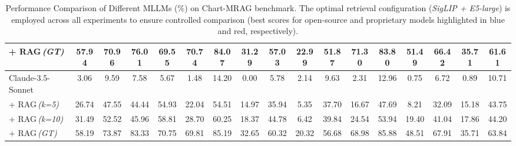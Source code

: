 \begin{table*}[t]
{\begin{tabular}{l|cc|c|c|cc|cc|cc|cc|cc|cc}
\hspace{2em}  + RAG\,\textit{(GT)} & 57.94 & 70.96 & 76.01 & 69.55 & \colorbox{lightblue!75}{70.74} & 84.07 & 31.29 & 57.03 & 22.99 & 51.87 & \colorbox{lightblue!75}{71.30} & 83.80 & \colorbox{lightblue!75}{51.49} & 66.42 & 35.71 & 61.61 \\

\midrule
Claude-3.5-Sonnet & \colorbox{lightblue!75}{3.06} & \colorbox{lightblue!75}{9.59} & 7.58 & 5.67 & 1.48 & 14.20 & \colorbox{lightblue!75}{0.00} & 5.78 & \colorbox{lightblue!75}{2.14} & \colorbox{lightblue!75}{9.63} & \colorbox{lightblue!75}{2.31} & 12.96 & 0.75 & \colorbox{lightblue!75}{6.72} & \colorbox{lightblue!75}{0.89} & \colorbox{lightblue!75}{10.71} \\

\hspace{2em}  + RAG\,\textit{(k=5)} & \colorbox{lightblue!75}{26.74} & \colorbox{lightblue!75}{47.55} & 44.44 & \colorbox{lightblue!75}{54.93} & 22.04 & \colorbox{lightblue!75}{54.51} & \colorbox{lightblue!75}{14.97} & \colorbox{lightblue!75}{35.94} & 5.35 & \colorbox{lightblue!75}{37.70} & 16.67 & \colorbox{lightblue!75}{47.69} & \colorbox{lightblue!75}{8.21} & \colorbox{lightblue!75}{32.09} & \colorbox{lightblue!75}{15.18} & \colorbox{lightblue!75}{43.75} \\

\hspace{2em}  + RAG\,\textit{(k=10)} & 31.49 & \colorbox{lightblue!75}{52.52} & 45.96 & \colorbox{lightblue!75}{58.81} & 28.70 & 60.25 & \colorbox{lightblue!75}{18.37} & \colorbox{lightblue!75}{44.78} & 6.42 & \colorbox{lightblue!75}{39.84} & 24.54 & \colorbox{lightblue!75}{53.94} & \colorbox{lightblue!75}{19.40} & \colorbox{lightblue!75}{41.04} & 17.86 & 44.20 \\

\hspace{2em}  + RAG\,\textit{(GT)} & \colorbox{lightblue!75}{58.19} &  \colorbox{lightblue!75}{73.87} & \colorbox{lightblue!75}{83.33} & \colorbox{lightblue!75}{70.75} & 69.81 & \colorbox{lightblue!75}{85.19} & \colorbox{lightblue!75}{32.65} & \colorbox{lightblue!75}{60.32} & 20.32 & \colorbox{lightblue!75}{56.68} & 68.98 & \colorbox{lightblue!75}{85.88} & 48.51 & \colorbox{lightblue!75}{67.91} & 35.71 & \colorbox{lightblue!75}{63.84} \\

\bottomrule
\end{tabular}
}
\caption{Performance Comparison of Different MLLMs (\%) on Chart-MRAG benchmark. The optimal retrieval configuration (\textit{SigLIP + E5-large}) is employed across all experiments to ensure controlled comparison (best scores for open-source and proprietary models highlighted in blue and red, respectively).}
\label{tab:generative_performance}
\end{table*}
